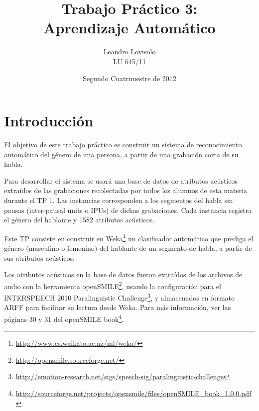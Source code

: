 \documentclass[10pt,a4paper]{article}
\title{Trabajo Práctico 3:\\Aprendizaje Automático}
\author{Leandro Lovisolo\\LU 645/11}
\date{Segundo Cuatrimestre de 2012}
\begin{document}
\maketitle
\thispagestyle{fancyplain}

\section{Introducción}

El objetivo de este trabajo práctico es construir un sistema de reconocimiento automático del género de una persona, a partir de una grabación corta de su habla.

Para desarrollar el sistema se usará una base de datos de atributos acústicos extraídos de las grabaciones recolectadas por todos los alumnos de esta materia durante el TP 1. Las instancias corresponden a los segmentos del habla sin pausas (inter-pausal units o IPUs) de dichas grabaciones. Cada instancia registra el género del hablante y 1582 atributos acústicos.

Este TP consiste en construir en Weka\footnote{\url{http://www.cs.waikato.ac.nz/ml/weka/}} un clasificador automático que prediga el género (masculino o femenino) del hablante de un segmento de habla, a partir de sus atributos acústicos.

Los atributos acústicos en la base de datos fueron extraídos de los archivos de audio con la herramienta openSMILE\footnote{\url{http://opensmile.sourceforge.net/}}, usando la configuración para el INTERSPEECH 2010 Paralinguistic Challenge\footnote{\url{http://emotion-research.net/sigs/speech-sig/paralinguistic-challenge}}, y almacenados en formato ARFF para facilitar su lectura desde Weka. Para más información, ver las páginas 30 y 31 del openSMILE book\footnote{\url{http://sourceforge.net/projects/opensmile/files/openSMILE\_book\_1.0.0.pdf}}.
\end{document}
